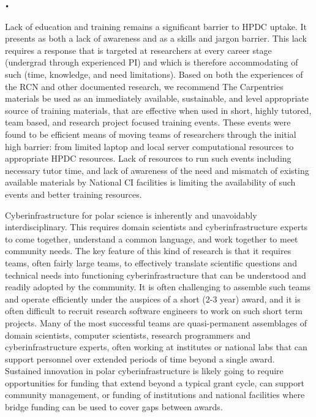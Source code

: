 \texttt{•}\documentclass[10pt,letterpaper,draft]{article}
\begin{document}
\begin{description}[style=unboxed]
\item[3. Education and Training ]
Lack of education and training remains a significant barrier to HPDC uptake. It presents as both a lack of awareness and as a skills and jargon barrier. This lack requires a response that is targeted at researchers at every career stage (undergrad through experienced PI) and which is therefore accommodating of such (time, knowledge, and need limitations). Based on both the experiences of the RCN and other documented research, we recommend The Carpentries materials be used as an immediately available, sustainable, and level appropriate source of training materials, that are effective when used in short, highly tutored, team based, and research project focused training events. These events were found to be efficient means of moving teams of researchers through the initial high barrier: from limited laptop and local server computational resources to appropriate HPDC resources.  Lack of resources to run such events including necessary tutor time, and lack of awareness of the need and mismatch of existing available materials by National CI facilities is limiting the availability of such events and better training resources.

\item[4.Sustained Investment in Collaboration:]
Cyberinfrastructure for polar science is inherently and unavoidably interdisciplinary. This requires domain scientists and cyberinfrastructure experts to come together, understand a common language, and work together to meet community needs. The key feature of this kind of research is that it requires teams, often fairly large teams, to effectively translate scientific questions and technical needs into functioning cyberinfrastructure that can be understood and readily adopted by the community. It is often challenging to assemble such teams and operate efficiently under the auspices of a short (2-3 year) award, and it is often difficult to recruit research software engineers to work on such short term projects. Many of the most successful teams are quasi-permanent assemblages of domain scientists, computer scientists, research programmers and cyberinfrastructure experts, often working at institutes or national labs that can support personnel over extended periods of time beyond a single award. Sustained innovation in polar cyberinfrastructure is likely going to require opportunities for funding that extend beyond a typical grant cycle, can support community management, or funding of institutions and national facilities where bridge funding can be used to cover gaps between awards. 


\end{description}
\end{document}

